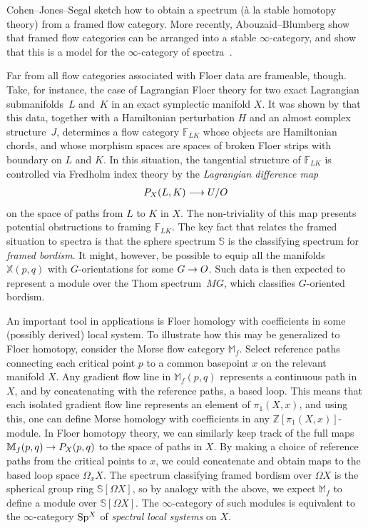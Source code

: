 \documentclass[10pt]{amsart}
\numberwithin{equation}{section}
\theoremstyle{definition}
\newcommand{\bF}{\mathbb{F}}
\newcommand{\bM}{\mathbb{M}}
\newcommand{\bS}{\mathbb{S}}
\newcommand{\bZ}{\mathbb{Z}}
\newcommand{\bX}{\mathbb{X}}
\newcommand{\Sp}{\mathrm{Sp}\vphantom{p}}
\renewcommand{\to}{\mathchoice{\longrightarrow}{\rightarrow}{}{}}
\begin{document}
Cohen--Jones--Segal sketch how to obtain a spectrum (à la stable homotopy theory) from a framed flow category.
More recently, Abouzaid--Blumberg show that framed flow categories can be arranged into a stable $\infty$-category, and show that this is a model for the $\infty$-category of spectra~\cite[Proposition 1.10]{AB}.


Far from all flow categories associated with Floer data are frameable, though.
Take, for instance, the case of Lagrangian Floer theory for two exact Lagrangian submanifolds~$L$ and~$K$ in an exact symplectic manifold $X$.
It was shown by \cite{large2021spectral} that this data, together with a Hamiltonian perturbation $H$ and an almost complex structure~$J$, determines a flow category $\bF_{LK}$ whose objects are Hamiltonian chords, and whose morphism spaces are spaces of broken Floer strips with boundary on $L$ and $K$.
In this situation, the tangential structure of $\bF_{LK}$ is controlled via Fredholm index theory by the \emph{Lagrangian difference map}
\begin{align*}
	P_{X}(L, K) \to U/O
\end{align*}
on the space of paths from $L$ to $K$ in $X$.
The non-triviality of this map presents potential obstructions to framing $\bF_{LK}$.
The key fact that relates the framed situation to spectra is that the sphere spectrum $\bS$ is the classifying spectrum for \emph{framed bordism}.
It might, however, be possible to equip all the manifolds $\bX(p,q)$ with $G$-orientations for some $G\to O$.
Such data is then expected to represent a module over the Thom spectrum~$MG$, which classifies $G$-oriented bordism.


An important tool in applications is Floer homology with coefficients in some (possibly derived) local system.
To illustrate how this may be generalized to Floer homotopy, consider the Morse flow category $\bM_{f}$.
Select reference paths connecting each critical point $p$ to a common basepoint $x$ on the relevant manifold $X$.
Any gradient flow line in $\bM_{f}(p,q)$ represents a continuous path in $X$, and by concatenating with the reference paths, a based loop.
This means that each isolated gradient flow line represents an element of $\pi_{1}(X,x)$, and using this, one can define Morse homology with coefficients in any $\bZ[\pi_{1}(X,x)]$-module.
In Floer homotopy theory, we can similarly keep track of the full maps $\bM_{f}(p,q) \to P_{X}(p,q)$ to the space of paths in $X$.
By making a choice of reference paths from the critical points to $x$, we could concatenate and obtain maps to the based loop space $\Omega_{x} X$.
The spectrum classifying framed bordism over $\Omega X$ is the spherical group ring $\bS[\Omega X]$, so by analogy with the above, we expect $\bM_{f}$ to define a module over $\bS[\Omega X]$.
The $\infty$-category of such modules is equivalent to the $\infty$-category $\Sp^{X}$ of \emph{spectral local systems} on $X$.
\end{document}
